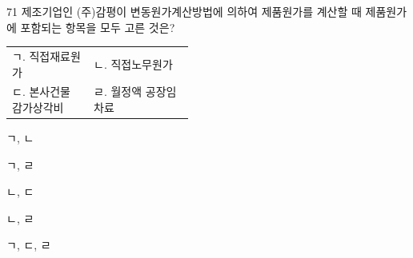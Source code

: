 \begin{question}{71}
제조기업인 (주)감평이 변동원가계산방법에 의하여 제품원가를 계산할 때 제품원가에 포함되는 항목을 모두 고른 것은?
\begin{framedtext}
\begin{tabular}{@{}p{0.45\linewidth}l@{}}
ㄱ. 직접재료원가 & ㄴ. 직접노무원가 \\
ㄷ. 본사건물 감가상각비 & ㄹ. 월정액 공장임차료 \\
\end{tabular}
\end{framedtext}
\begin{choices}
  \item ㄱ, ㄴ
  \item ㄱ, ㄹ
  \item ㄴ, ㄷ
  \item ㄴ, ㄹ
  \item ㄱ, ㄷ, ㄹ
\end{choices}
\end{question}
